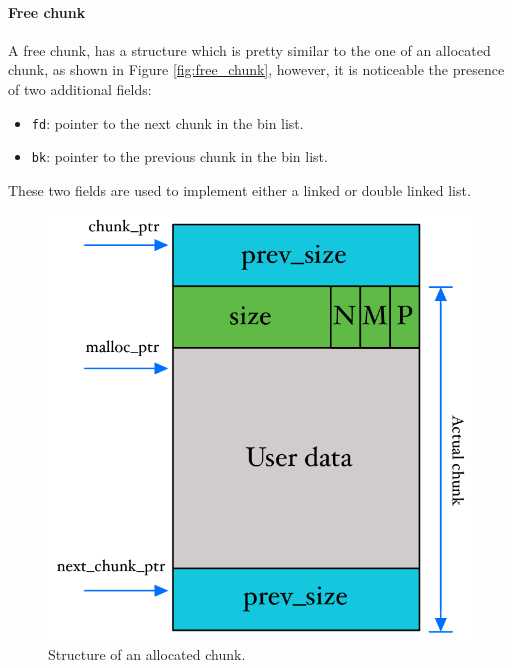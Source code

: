 \documentclass{article}
\numberwithin{equation}{subsection}
\begin{document}
\paragraph{Free chunk}
A free chunk, has a structure which is pretty similar to the one of an allocated chunk, as shown in Figure \ref{fig:free_chunk}, however, it is noticeable the presence of two additional fields:
\begin{itemize}
    \item \texttt{fd}: pointer to the next chunk in the bin list.
    \item \texttt{bk}: pointer to the previous chunk in the bin list.
\end{itemize}
These two fields are used to implement either a linked or double linked list.
\begin{figure}[H]
  \centering
  \begin{minipage}[b]{0.46\textwidth}
    \includegraphics[width=\textwidth]{allocated_chunk.pdf}
    \caption{Structure of an allocated chunk.}
    \label{fig:allocated_chunk}
  \end{minipage}
  \hfill
  \begin{minipage}[b]{0.5\textwidth}

\end{minipage}
\end{figure}
\end{document}
